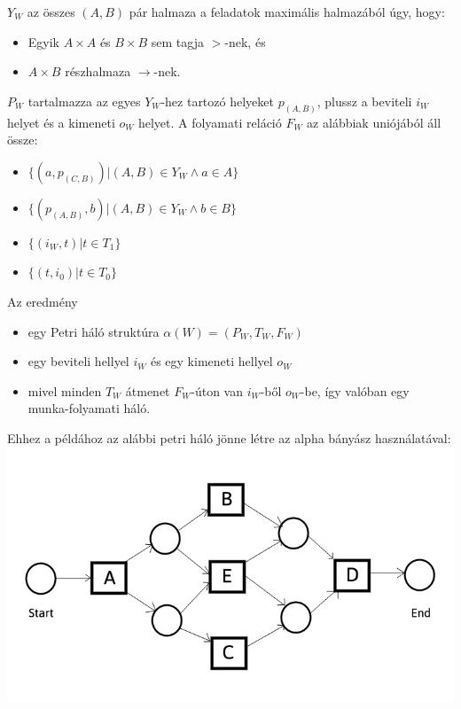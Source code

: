 \noindent $Y_W$ az összes $(A,B)$  pár halmaza a feladatok maximális halmazából úgy, hogy:
\begin{itemize}
	\item {Egyik $A \times A$ és $B \times B$ sem tagja $>$-nek, és}
	\item {$A \times B$ részhalmaza $\rightarrow$-nek.}
\end{itemize}
\noindent $P_W$ tartalmazza az egyes $Y_W$-hez tartozó helyeket $p_(A,B)$, plussz a beviteli $i_W$ helyet és a kimeneti $o_W$ helyet.
\newpage
\noindent A folyamati reláció $F_W$ az alábbiak uniójából áll össze:
\begin{itemize}
\item $\{(a,p_{(C,B)})|(A,B) \in Y_W \wedge a \in A\}$
\item $\{(p_{(A,B)},b)|(A,B) \in Y_W \wedge b \in B\}$
\item $\{(i_W,t)|t \in T_1\}$
\item $\{(t,i_0)|t \in T_0\}$
\end{itemize}

\noindent Az eredmény

\begin{itemize}
\item egy Petri háló struktúra $\alpha (W) = (P_W, T_W, F_W)$
\item egy beviteli hellyel $i_W$ és egy kimeneti hellyel $o_W$
\item mivel minden $T_W$ átmenet $F_W$-úton van $i_W$-ből $o_W$-be, így valóban egy munka\hyp{}folyamati háló.
\end{itemize}

\noindent Ehhez a példához az alábbi petri háló jönne létre az alpha bányász használatával:
\includegraphics[width=\textwidth,height=\textheight,keepaspectratio]{images/img_alpha_petri_output}\\


